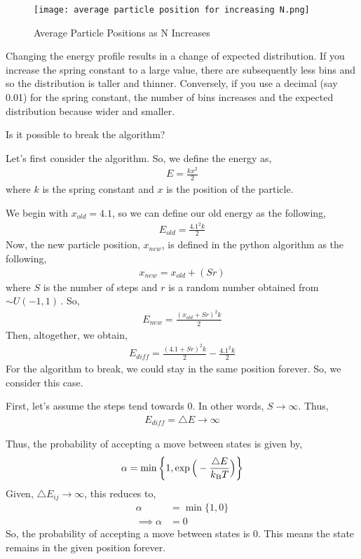 \documentclass[12pt]{article}
\begin{document}
\begin{figure}[h!]
  \texttt{[image: average particle position for increasing N.png]}
  \caption{Average Particle Positions as N Increases}
  \label{fig:mc_randomness}
\end{figure}

Changing the energy profile results in a change of expected distribution. If you increase the spring constant to a large value, there are subsequently less bins and so the distribution is taller and thinner. Conversely, if you use a decimal (say 0.01) for the spring constant, the number of bins increases and the expected distribution because wider and smaller.

Is it possible to break the algorithm?

Let's first consider the algorithm. So, we define the energy as,
 \begin{align} 
E = \frac{kx^2}{2}
\end{align}
where $k$ is the spring constant and $x$ is the position of the particle.

We begin with $x_{old} = 4.1$, so we can define our old energy as the following,
 \begin{align} 
E_{old} = \frac{4.1^2 k}{2}
\end{align}
Now, the new particle position, $x_{new}$, is defined in the python algorithm as the following,
 \begin{align} 
x_{new} = x_{old} + (Sr)
\end{align}
where $S$ is the number of steps and $r$ is a random number obtained from $\sim U(-1,1)\,$.
So,
 \begin{align} 
E_{new} = \frac{(x_{old} + Sr)^2k}{2}
\end{align}
Then, altogether, we obtain,
 \begin{align} 
E_{diff} = \frac{(4.1 + Sr)^2k}{2} - \frac{4.1^2 k}{2}
\end{align}
For the algorithm to break, we could stay in the same position forever. So, we consider this case.

First, let's assume the steps tend towards 0. In other words, $S \to \infty$. Thus, 
 \begin{align} 
E_{diff} = \triangle{E} \to \infty
\end{align}

Thus, the probability of accepting a move between states is given by, 
\begin{align} 
\alpha = \min \bigg\{ 1, \exp \Big(-\frac{\triangle{E}}{k\textsubscript{B} T}\Big) \bigg\}
\end{align}
Given, $\triangle{E_{i j}} \to \infty$, this reduces to, 
\begin{align} 
\alpha &= \min \{ 1, 0\} \\
\implies \alpha &= 0
\end{align}
So, the probability of accepting a move between states is 0. This means the state remains in the given position forever. 
\end{document}
